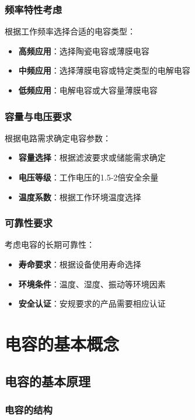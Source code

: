 \documentclass[12pt,UTF8]{ctexbook}
\begin{document}
\subsection{频率特性考虑}

根据工作频率选择合适的电容类型：
\begin{itemize}[leftmargin=3.5em]
    \item \textbf{高频应用}：选择陶瓷电容或薄膜电容
    \item \textbf{中频应用}：选择薄膜电容或特定类型的电解电容
    \item \textbf{低频应用}：电解电容或大容量薄膜电容
\end{itemize}

\subsection{容量与电压要求}

根据电路需求确定电容参数：
\begin{itemize}[leftmargin=3.5em]
    \item \textbf{容量选择}：根据滤波要求或储能需求确定
    \item \textbf{电压等级}：工作电压的1.5-2倍安全余量
    \item \textbf{温度系数}：根据工作环境温度选择
\end{itemize}

\subsection{可靠性要求}

考虑电容的长期可靠性：
\begin{itemize}[leftmargin=3.5em]
    \item \textbf{寿命要求}：根据设备使用寿命选择
    \item \textbf{环境条件}：温度、湿度、振动等环境因素
    \item \textbf{安全认证}：安规要求的产品需要相应认证
\end{itemize}

\chapter{电容的基本概念}

\section{电容的基本原理}

\subsection{电容的结构}
\end{document}

